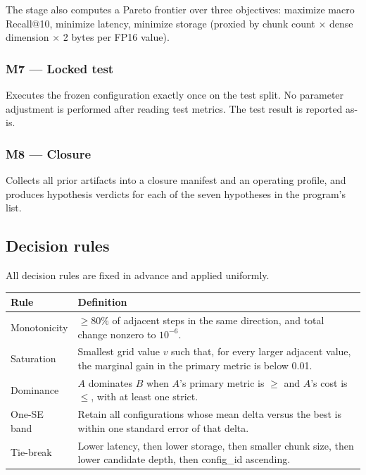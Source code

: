 \documentclass[11pt,a4paper]{article}
\begin{document}
The stage also computes a Pareto frontier over three objectives:
maximize macro Recall@10, minimize latency, minimize storage
(proxied by chunk count $\times$ dense dimension $\times$ 2 bytes
per FP16 value).

\subsubsection{M7 --- Locked test}
Executes the frozen configuration exactly once on the test split.
No parameter adjustment is performed after reading test metrics. The
test result is reported as-is.

\subsubsection{M8 --- Closure}
Collects all prior artifacts into a closure manifest and an operating
profile, and produces hypothesis verdicts for each of the seven
hypotheses in the program's list.

\subsection{Decision rules}
All decision rules are fixed in advance and applied uniformly.

\begin{center}
\small
\begin{tabular}{p{3cm} p{11cm}}
\toprule
\textbf{Rule} & \textbf{Definition} \\
\midrule
Monotonicity & $\geq \num{80}\%$ of adjacent steps in the same
  direction, and total change nonzero to $10^{-6}$. \\
Saturation & Smallest grid value $v$ such that, for every larger
  adjacent value, the marginal gain in the primary metric is below
  \num{0.01}. \\
Dominance & $A$ dominates $B$ when $A$'s primary metric is $\geq$
  and $A$'s cost is $\leq$, with at least one strict. \\
One-SE band & Retain all configurations whose mean delta versus
  the best is within one standard error of that delta. \\
Tie-break & Lower latency, then lower storage, then smaller chunk
  size, then lower candidate depth, then config\_id ascending. \\
\bottomrule
\end{tabular}
\end{center}

\end{document}
